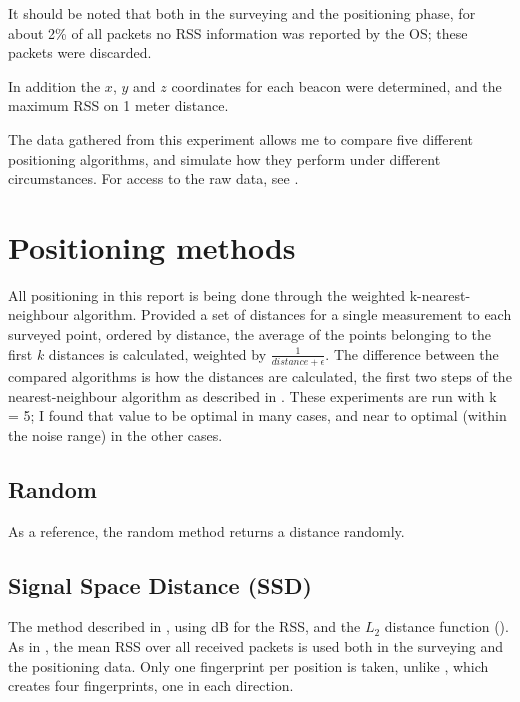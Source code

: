 It should be noted that both in the surveying and the positioning phase, for about 2\% of all packets no RSS information was reported by the OS; these packets were discarded.

In addition the $x$, $y$ and $z$ coordinates for each beacon were determined, and the maximum RSS on 1 meter distance.

The data gathered from this experiment allows me to compare five different positioning algorithms, and simulate how they perform under different circumstances.
For access to the raw data, see .

\section{Positioning methods}

All positioning in this report is being done through the weighted k-nearest-neighbour algorithm.
Provided a set of distances for a single measurement to each surveyed point, ordered by distance, the average of the points belonging to the first $k$ distances is calculated, weighted by $\frac{1}{distance+\epsilon}$.
The difference between the compared algorithms is how the distances are calculated, the first two steps of the nearest-neighbour algorithm as described in .
These experiments are run with k = 5; I found that value to be optimal in many cases, and near to optimal (within the noise range) in the other cases.

\subsection{Random}
As a reference, the random method returns a distance randomly.

\subsection{Signal Space Distance (SSD)}
The method described in \citet{bahl2000radar}, using dB for the RSS, and the $L_2$ distance function ().
As in \citet{bahl2000radar}, the mean RSS over all received packets is used both in the surveying and the positioning data.
Only one fingerprint per position is taken, unlike \citet{bahl2000radar}, which creates four fingerprints, one in each direction.

